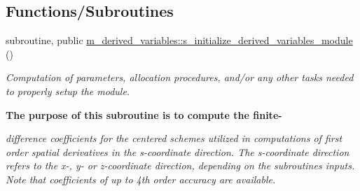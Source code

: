 \subsection*{Functions/\+Subroutines}
\begin{DoxyCompactItemize}
\item 
subroutine, public \hyperlink{namespacem__derived__variables_a15a6d70e2bd1c9b7001c753ca1f2ee27}{m\+\_\+derived\+\_\+variables\+::s\+\_\+initialize\+\_\+derived\+\_\+variables\+\_\+module} ()
\begin{DoxyCompactList}\small\item\em Computation of parameters, allocation procedures, and/or any other tasks needed to properly setup the module. \end{DoxyCompactList}\end{DoxyCompactItemize}
\begin{Indent}\textbf{ The purpose of this subroutine is to compute the finite-\/}\par
{\em difference coefficients for the centered schemes utilized in computations of first order spatial derivatives in the s-\/coordinate direction. The s-\/coordinate direction refers to the x-\/, y-\/ or z-\/coordinate direction, depending on the subroutine\textquotesingle{}s inputs. Note that coefficients of up to 4th order accuracy are available.


}
\end{Indent}
